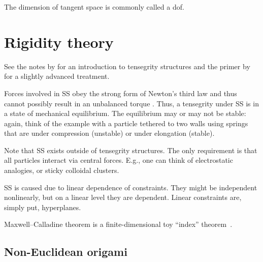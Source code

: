The dimension of tangent space is commonly called a \ac{dof}.

\begin{theorem}
\end{theorem}

\section{Rigidity theory}

See the notes by \citet{connelly2015} for an introduction to tensegrity structures and the primer by \citet{williams2016} for a slightly advanced treatment.

Forces involved in SS obey the strong form of Newton's third law and thus cannot possibly result in an unbalanced torque \cite[Section 1.2]{goldstein2002}.
Thus, a tensegrity under SS is in a state of mechanical equilibrium.
The equilibrium may or may not be stable: again, think of the example with a particle tethered to two walls using springs that are under compression (unstable) or under elongation (stable).

Note that SS exists outside of tensegrity structures.
The only requirement is that all particles interact via central forces.
E.g., one can think of electrostatic analogies, or sticky colloidal clusters.

SS is caused due to linear dependence of constraints.
They might be independent nonlinearly, but on a linear level they are dependent.
Linear constraints are, simply put, hyperplanes.

Maxwell--Calladine theorem is a finite-dimensional toy ``index'' theorem~\cite[Section 2.2]{nakahara2003}.

\subsection{Non-Euclidean origami}

